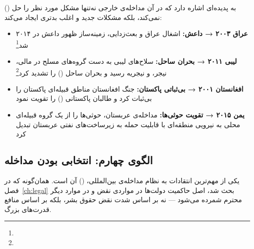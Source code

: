 {\begin{tcolorbox}[wavebox, title={الگوی سوم: اثر بومرنگ}]
 () به پدیده‌ای اشاره دارد که در آن مداخله‌ی خارجی نه‌تنها مشکل مورد نظر را حل نمی‌کند، بلکه مشکلات جدید و اغلب بدتری ایجاد می‌کند:
\begin{itemize}
\item \textbf{عراق ۲۰۰۳ → داعش:} اشغال عراق و بعث‌زدایی، زمینه‌ساز ظهور داعش در ۲۰۱۴ شد\footnote{}
\item \textbf{لیبی ۲۰۱۱ → بحران ساحل:} سلاح‌های لیبی به دست گروه‌های مسلح در مالی، نیجر، و نیجریه رسید و بحران ساحل () را تشدید کرد\footnote{}
\item \textbf{افغانستان ۲۰۰۱ → بی‌ثباتی پاکستان:} جنگ افغانستان مناطق قبیله‌ای پاکستان را بی‌ثبات کرد و طالبان پاکستانی () را تقویت نمود
\item \textbf{یمن ۲۰۱۵ → تقویت حوثی‌ها:} مداخله‌ی عربستان، حوثی‌ها را از یک گروه قبیله‌ای محلی به نیرویی منطقه‌ای با قابلیت حمله به زیرساخت‌های نفتی عربستان تبدیل کرد
\end{itemize}
\end{tcolorbox}

\subsection{الگوی چهارم: انتخابی بودن مداخله}
\label{subsec:ch10-selectivity}

یکی از مهم‌ترین انتقادات به نظام مداخله‌ی بین‌المللی،  () آن است. همان‌گونه که در فصل~\ref{ch:legal} بحث شد، اصل حاکمیت دولت‌ها در مواردی نقض و در موارد دیگر محترم شمرده می‌شود — نه بر اساس شدت نقض حقوق بشر، بلکه بر اساس منافع قدرت‌های بزرگ.

}
